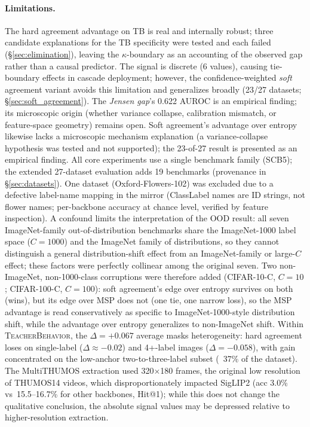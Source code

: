 \documentclass[a4paper,fleqn]{cas-sc}
\newcommand{\tb}{\textsc{TeacherBehavior}}
\newcommand{\scbfive}{\textsc{SCB5}}
\begin{document}
\paragraph{Limitations.}
The hard agreement advantage on TB is real and internally robust; three candidate explanations for the TB specificity were tested and each failed (\S\ref{sec:elimination}), leaving the $\kappa$-boundary as an accounting of the observed gap rather than a causal predictor.
The signal is discrete (6 values), causing tie-boundary effects in cascade deployment; however, the confidence-weighted \emph{soft} agreement variant avoids this limitation and generalizes broadly (23/27 datasets; \S\ref{sec:soft_agreement}).
The \emph{Jensen gap}'s 0.622 AUROC is an empirical finding; its microscopic origin (whether variance collapse, calibration mismatch, or feature-space geometry) remains open. Soft agreement's advantage over entropy likewise lacks a microscopic mechanism explanation (a variance-collapse hypothesis was tested and not supported); the 23-of-27 result is presented as an empirical finding.
All core experiments use a single benchmark family (\scbfive{}); the extended 27-dataset evaluation adds 19 benchmarks (provenance in \S\ref{sec:datasets}). One dataset (Oxford-Flowers-102) was excluded due to a defective label-name mapping in the mirror (ClassLabel names are ID strings, not flower names; per-backbone accuracy at chance level, verified by feature inspection).
A confound limits the interpretation of the OOD result: all seven ImageNet-family out-of-distribution benchmarks share the ImageNet-1000 label space ($C{=}1000$) and the ImageNet family of distributions, so they cannot distinguish a general distribution-shift effect from an ImageNet-family or large-$C$ effect; these factors were perfectly collinear among the original seven. Two non-ImageNet, non-1000-class corruptions were therefore added (CIFAR-10-C, $C{=}10$; CIFAR-100-C, $C{=}100$): soft agreement's edge over entropy survives on both (wins), but its edge over MSP does not (one tie, one narrow loss), so the MSP advantage is read conservatively as specific to ImageNet-1000-style distribution shift, while the advantage over entropy generalizes to non-ImageNet shift.
Within \tb, the $\Delta = +0.067$ average masks heterogeneity: hard agreement loses on single-label ($\Delta \approx -0.02$) and 4+-label images ($\Delta = -0.058$), with gain concentrated on the low-anchor two-to-three-label subset (~37\% of the dataset).
The MultiTHUMOS extraction used 320$\times$180 frames, the original low resolution of THUMOS14 videos, which disproportionately impacted SigLIP2 (acc 3.0\% vs~15.5--16.7\% for other backbones, Hit@1); while this does not change the qualitative conclusion, the absolute signal values may be depressed relative to higher-resolution extraction.
\end{document}
